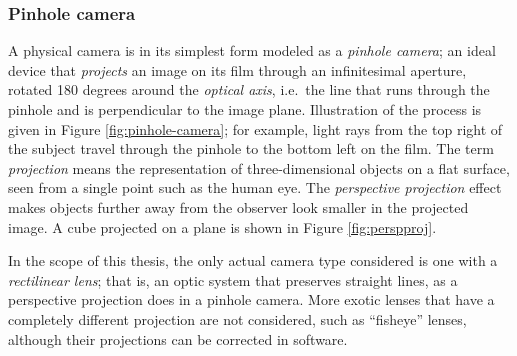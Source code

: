 
\subsubsection{Pinhole camera} \label{sec:pinhole} %




A physical camera is in its simplest form modeled as a \emph{pinhole camera}; an ideal device that \emph{projects} an image on its film through an infinitesimal aperture, rotated 180 degrees around the \emph{optical axis}, i.e.\ the line that runs through the pinhole and is perpendicular to the image plane.
Illustration of the process is given in Figure \ref{fig:pinhole-camera}; for example, light rays from the top right of the subject travel through the pinhole to the bottom left on the film.
The term \emph{projection} means the representation of three-dimensional objects on a flat surface, seen from a single point such as the human eye.
The \emph{perspective projection} effect makes objects further away from the observer look smaller in the projected image.
A cube projected on a plane is shown in Figure \ref{fig:perspproj}.

In the scope of this thesis, the only actual camera type considered is one with a \emph{rectilinear lens}; that is, an optic system that preserves straight lines, as a perspective projection does in a pinhole camera.
More exotic lenses that have a completely different projection are not considered, such as ``fisheye'' lenses, although their projections can be corrected in software.


